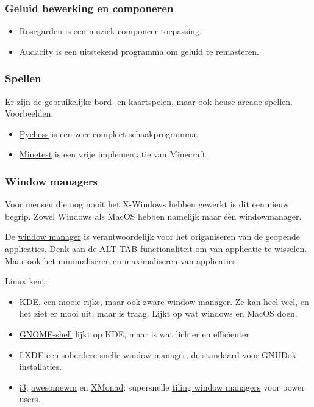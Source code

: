 \subsubsection{Geluid bewerking en componeren}
\begin{itemize}
	\item \href{http://www.rosegardenmusic.com/}{Rosegarden} is een muziek componeer toepassing.
	\item \href{http://audacity.sourceforge.net/}{Audacity} is een uitstekend programma om geluid te remasteren.
\end{itemize}


\subsubsection{Spellen}
Er zijn de gebruikelijke bord- en kaartspelen, maar ook heuse arcade-spellen. Voorbeelden:
\begin{itemize}
	\item \href{http://pychess.org/}{Pychess} is een zeer compleet schaakprogramma.
	\item \href{http://www.minetest.net/}{Minetest} is een vrije implementatie van Minecraft.
\end{itemize}

\subsubsection{Window managers}
Voor mensen die nog nooit het X-Windows hebben gewerkt is dit een nieuw begrip. Zowel Windows als MacOS hebben namelijk maar \'{e}\'{e}n windowmanager. 

De \href{https://en.wikipedia.org/wiki/Window_manager}{window manager} is verantwoordelijk voor het origaniseren van de geopende applicaties. Denk aan de \textsc{ALT-TAB} functionaliteit om van applicatie te wisselen. Maar ook het minimaliseren en maximaliseren van applicaties.

Linux kent:
\begin{itemize}
	\item \href{https://www.kde.org/}{KDE}, een mooie rijke, maar ook zware window manager. Ze kan heel veel, en het ziet er mooi uit, maar is traag. Lijkt op wat windows en MacOS doen.
	\item \href{http://www.gnome.org/}{GNOME-shell} lijkt op KDE, maar is wat lichter en effic\"{i}enter
	\item \href{http://lxde.org/}{LXDE} een soberdere snelle window manager, de standaard voor GNUDok installaties.
	\item \href{http://i3wm.org/}{i3}, \href{http://awesome.naquadah.org/}{awesomewm} en \href{http://xmonad.org/}{XMonad}: supersnelle \href{https://en.wikipedia.org/wiki/Tiling_window_manager}{tiling window managers} voor power users.
\end{itemize}

